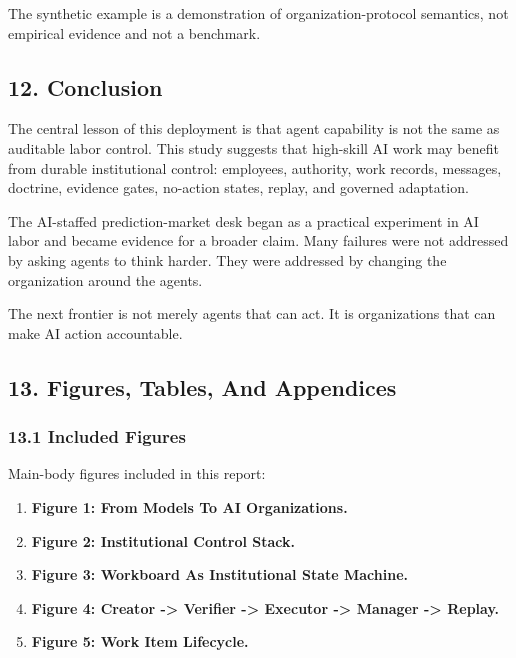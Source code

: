 \documentclass[
]{article}
\providecommand{\tightlist}{%
  \setlength{\itemsep}{0pt}\setlength{\parskip}{0pt}}
\begin{document}
The synthetic example is a demonstration of organization-protocol semantics, not empirical evidence and not a benchmark.

\subsection{12. Conclusion}\label{conclusion}

The central lesson of this deployment is that agent capability is not the same as auditable labor control. This study suggests that high-skill AI work may benefit from durable institutional control: employees, authority, work records, messages, doctrine, evidence gates, no-action states, replay, and governed adaptation.

The AI-staffed prediction-market desk began as a practical experiment in AI labor and became evidence for a broader claim. Many failures were not addressed by asking agents to think harder. They were addressed by changing the organization around the agents.

The next frontier is not merely agents that can act. It is organizations that can make AI action accountable.

\subsection{13. Figures, Tables, And Appendices}\label{figures-tables-and-appendices}

\subsubsection{13.1 Included Figures}\label{included-figures}

Main-body figures included in this report:

\begin{enumerate}
\def\labelenumi{\arabic{enumi}.}
\tightlist
\item
  \textbf{Figure 1: From Models To AI Organizations.}
\item
  \textbf{Figure 2: Institutional Control Stack.}
\item
  \textbf{Figure 3: Workboard As Institutional State Machine.}
\item
  \textbf{Figure 4: Creator -\textgreater{} Verifier -\textgreater{} Executor -\textgreater{} Manager -\textgreater{} Replay.}
\item
  \textbf{Figure 5: Work Item Lifecycle.}
\end{enumerate}
\end{document}
